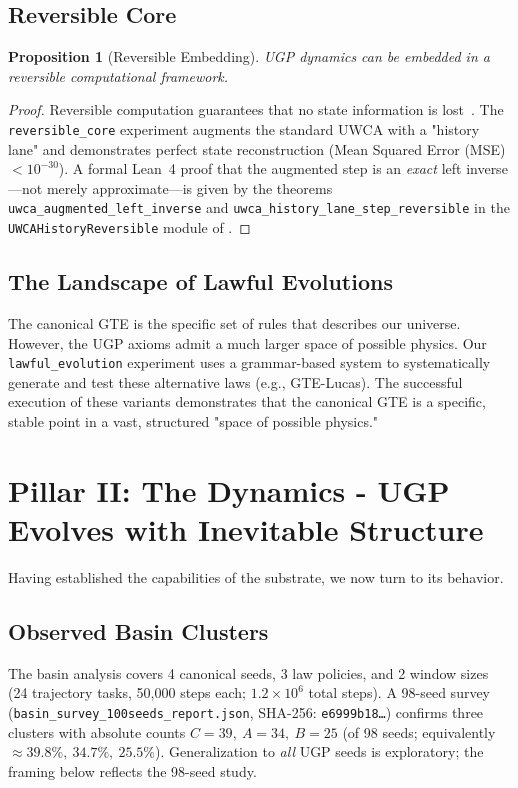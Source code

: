 \documentclass[11pt]{article}
\newtheorem{proposition}{Proposition}[section]
\begin{document}
\subsection{Reversible Core}
\begin{proposition}[Reversible Embedding]
UGP dynamics can be embedded in a reversible computational framework.
\end{proposition}
\begin{proof}
Reversible computation guarantees that no state information is lost~\cite{bennett1973logical,Landauer1961}.
The \texttt{reversible\_core} experiment augments the standard UWCA with a "history lane" and demonstrates perfect state reconstruction (Mean Squared Error (MSE) $< 10^{-30}$). A formal Lean~4 proof that the augmented step is an \emph{exact} left inverse—not merely approximate—is given by the theorems \texttt{uwca\_augmented\_left\_inverse} and \texttt{uwca\_history\_lane\_step\_reversible} in the \texttt{UWCAHistoryReversible} module of \cite{ugp-lean}.
\end{proof}

\subsection{The Landscape of Lawful Evolutions}
The canonical GTE is the specific set of rules that describes our universe. However, the UGP axioms admit a much larger space of possible physics. Our \texttt{lawful\_evolution} experiment uses a grammar-based system to systematically generate and test these alternative laws (e.g., GTE-Lucas). The successful execution of these variants demonstrates that the canonical GTE is a specific, stable point in a vast, structured "space of possible physics."

\section{Pillar II: The Dynamics - UGP Evolves with Inevitable Structure}
\label{sec:pillar_two}
Having established the capabilities of the substrate, we now turn to its behavior.

\subsection{Observed Basin Clusters}

\begin{tcolorbox}[colback=gray!8,colframe=gray!50,fontupper=\small,title=Basin Study Scope]
The basin analysis covers 4 canonical seeds, 3 law policies, and 2 window sizes (24 trajectory tasks, 50{,}000 steps each; $1.2{\times}10^6$ total steps). A 98-seed survey (\texttt{basin\_survey\_100seeds\_report.json}, SHA-256: \texttt{e6999b18\dots}) confirms three clusters with absolute counts $C{=}39,\ A{=}34,\ B{=}25$ (of 98 seeds; equivalently $\approx 39.8\%,\ 34.7\%,\ 25.5\%$). Generalization to \emph{all} UGP seeds is exploratory; the framing below reflects the 98-seed study.
\end{tcolorbox}
\end{document}
